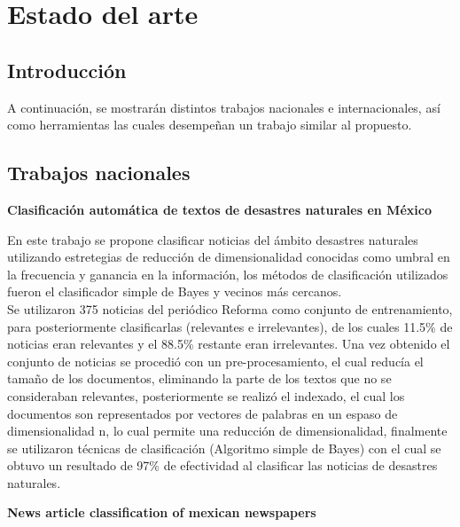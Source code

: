
\chapter{Estado del arte}

\section{Introducción}

A continuación, se mostrarán distintos trabajos nacionales e internacionales, así como herramientas las cuales desempeñan un trabajo similar al propuesto.

\section{Trabajos nacionales}

\begin{large}
	 \textbf{Clasificación automática de textos de desastres naturales en México}\\
\end{large}

En este trabajo se propone clasificar noticias del ámbito desastres naturales utilizando estretegias de reducción de dimensionalidad conocidas como umbral en la frecuencia y ganancia en la información, los métodos de clasificación utilizados fueron el clasificador simple de Bayes y vecinos más cercanos.\\

Se utilizaron 375 noticias del periódico Reforma como conjunto de entrenamiento, para posteriormente clasificarlas (relevantes e irrelevantes), de los cuales 11.5\% de noticias eran relevantes y el 88.5\% restante eran irrelevantes. Una vez obtenido el conjunto de noticias se procedió con un pre-procesamiento, el cual reducía el tamaño de los documentos, eliminando la parte de los textos que no se consideraban relevantes, posteriormente se realizó el indexado, el cual los documentos son representados por vectores de palabras en un espaso de dimensionalidad n, lo cual permite una reducción de dimensionalidad, finalmente se utilizaron técnicas de clasificación (Algoritmo simple de Bayes) con el cual se obtuvo un resultado de 97\% de efectividad al clasificar las noticias de desastres naturales\cite{cuatro}.\\

\begin{large}
	 \textbf{News article classification of mexican newspapers}\\
\end{large}

